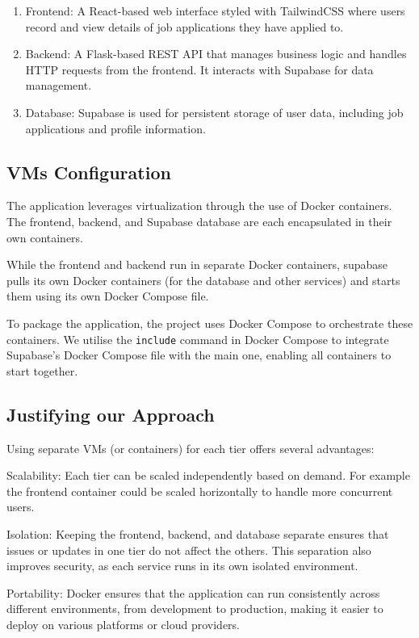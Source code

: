 \documentclass[a4paper, 11pt]{article}
\begin{document}
\begin{enumerate}
    \item Frontend: A React-based web interface styled with TailwindCSS where users record and view details of job applications they have applied to.
    \item Backend: A Flask-based REST API that manages business logic and handles HTTP requests from the frontend. It interacts with Supabase for data management.
    \item Database: Supabase is used for persistent storage of user data, including job applications and profile information.
\end{enumerate}

\subsection*{VMs Configuration}
The application leverages virtualization through the use of Docker containers. The frontend, backend, and Supabase database are each encapsulated in their own containers. 

While the frontend and backend run in separate Docker containers, supabase pulls its own Docker containers (for the database and other services) and starts them using its own Docker Compose file.

To package the application, the project uses Docker Compose to orchestrate these containers. We utilise the \texttt{include} command in Docker Compose to integrate Supabase's Docker Compose file with the main one, enabling all containers to start together.

\subsection*{Justifying our Approach}
Using separate VMs (or containers) for each tier offers several advantages:

Scalability: Each tier can be scaled independently based on demand. For example the frontend container could be scaled horizontally to handle more concurrent users.

Isolation: Keeping the frontend, backend, and database separate ensures that issues or updates in one tier do not affect the others. This separation also improves security, as each service runs in its own isolated environment.

Portability: Docker ensures that the application can run consistently across different environments, from development to production, making it easier to deploy on various platforms or cloud providers.
\end{document}
